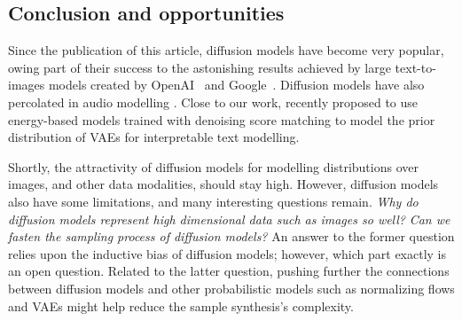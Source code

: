 \subsection{Conclusion and opportunities}
Since the publication of this article, diffusion models have become very popular, owing part of their success to the astonishing results achieved by large text-to-images models created by OpenAI~\citep[$\text{DALL}\cdot\text{E } 2$][]{ramesh2022hierarchical} and Google~\citep[Imagen][]{saharia2022photorealistic}. Diffusion models have also percolated in audio modelling \citep{kong2020diffwave}. Close to our work, \citet{yu2022latent} recently proposed to use energy-based models trained with denoising score matching to model the prior distribution of VAEs for interpretable text modelling.

Shortly, the attractivity of diffusion models for modelling distributions over images, and other data modalities, should stay high. However, diffusion models also have some limitations, and many interesting questions remain. \textit{Why do diffusion models represent high dimensional data such as images so well?} \textit{Can we fasten the sampling process of diffusion models?}
 An answer to the former question relies upon the inductive bias of diffusion models; however, which part exactly is an open question. Related to the latter question, pushing further the connections between diffusion models and other probabilistic models such as normalizing flows and VAEs might help reduce the sample synthesis's complexity.
%
